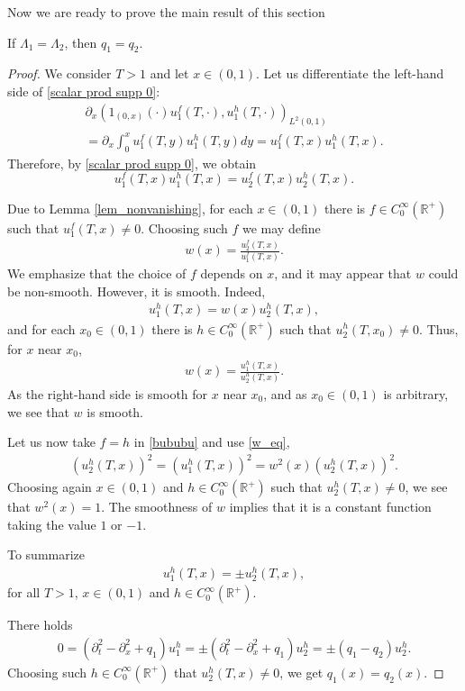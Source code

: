 \documentclass[12pt,oneside,final]{amsart}
\newcommand{\HOX}[1]{\todo[noline,color=white,size=\footnotesize]{#1}}
\def\R{\mathbb R}
\begin{document}
Now we are ready to prove the main result of this section
\begin{theorem}\label{th_1d_main}
	If $\Lambda_1=\Lambda_2$, then $q_1=q_2$.
\end{theorem}
\begin{proof}
We consider $T > 1$ and let $x\in (0,1)$. Let us differentiate the left-hand side of \eqref{scalar prod supp 0}:
\begin{multline*}
	\partial_x 	\left(1_{(0,x)}(\cdot)u_1^f (T, \cdot), u_1^h (T, \cdot)\right)_{L^2(0,1)} \\
	= \partial_x\int_{0}^{x} u_1^f (T, y) u_1^h (T, y) dy = u_1^f (T, x) u_1^h (T, x).
\end{multline*}
Therefore, by \eqref{scalar prod supp 0}, we obtain
\begin{equation}\label{bububu}
	u_1^f (T, x) u_1^h (T, x) = u_2^f (T, x) u_2^h (T, x).
\end{equation}

Due to Lemma \ref{lem_nonvanishing},
for each $x \in (0,1)$ there is $f \in C_0^\infty(\R^+)$ such that 
$u_1^f(T,x) \ne 0$. Choosing such $f$ we may define
	\begin{align*}
w(x) = \frac{u_2^f (T, x)}{u_1^f (T, x)}.
	\end{align*}
We emphasize that the choice of $f$ depends on $x$, and it may appear that $w$ could be non-smooth. However, it is smooth. Indeed, 
	\begin{align}\label{w_eq}
u_1^h (T, x) = w(x) u_2^h (T, x),
	\end{align}
and for each $x_0 \in (0,1)$ there is $h \in C_0^\infty(\R^+)$ such that 
$u_2^h(T,x_0) \ne 0$. Thus, for $x$ near $x_0$,
	\begin{align*}
w(x) = \frac{u_1^h (T, x)}{u_2^h (T, x)}.
	\end{align*}
As the right-hand side is smooth for $x$ near $x_0$, and as $x_0 \in (0,1)$ is arbitrary, we see that $w$ is smooth. 

Let us now take $f = h$ in \eqref{bububu} and use \eqref{w_eq},
	\begin{align*}
(u_2^h(T,x))^2 = (u_1^h(T,x))^2 = w^2(x) (u_2^h(T,x))^2.
	\end{align*} 
Choosing again $x \in (0,1)$ and $h \in C_0^\infty(\R^+)$ such that 
$u_2^h(T,x) \ne 0$, we see that $w^2(x) = 1$.
The smoothness of $w$ implies that it is a constant function
taking the value $1$ or $-1$. 

To summarize 
	\begin{align*}
u_1^h (T, x) = \pm u_2^h (T, x),
	\end{align*}
for all $T > 1$, $x \in (0,1)$ and $h \in C_0^\infty(\R^+)$.


There holds
	\begin{align*}
0 = (\partial_t^2 - \partial_x^2 + q_1) u_1^h 
= \pm (\partial_t^2 - \partial_x^2 + q_1) u_2^h 
= \pm (q_1 - q_2) u_2^h.
	\end{align*}
Choosing such $h \in C^\infty_0(\R^+)$ that $u_2^h(T,x) \ne 0$, we get 
$q_1(x) = q_2(x)$.
\end{proof}
\end{document}
